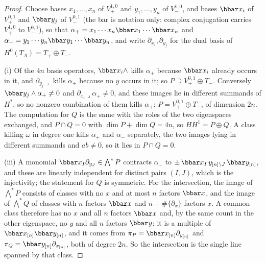 \begin{proof}
Choose bases $x_{1},\dots,x_{n}$ of $V_{+}^{1,0}$ and $y_{1},\dots,y_{n}$ of
$V_{-}^{1,0}$, and bases $\bbar x_{i}$ of $V_{+}^{0,1}$ and $\bbar y_{j}$ of
$V_{-}^{0,1}$ (the bar is notation only: complex conjugation carries
$V_{+}^{1,0}$ to $V_{-}^{0,1}$), so that $\alpha_{+}=x_{1}\cdots x_{n}\bbar x_{1}\cdots\bbar x_{n}$
and $\alpha_{-}=y_{1}\cdots y_{n}\bbar y_{1}\cdots\bbar y_{n}$, and write
$\partial_{x_{i}},\partial_{y_{j}}$ for the dual basis of
$H^{0}(T_{A})=T_{+}\oplus T_{-}$.

(i) Of the $4n$ basis operators, $\bbar x_{i}\wedge$ kills $\alpha_{+}$
because $\bbar x_{i}$ already occurs in it, and $\partial_{y_{j}}\lrcorner$
kills $\alpha_{+}$ because no $y$ occurs in it; so $P\supseteq
V_{+}^{0,1}\oplus T_{-}$. Conversely $\bbar y_{j}\wedge\alpha_{+}\ne0$ and
$\partial_{x_{i}}\lrcorner\alpha_{+}\ne0$, and these images lie in different
summands of $H^{*}$, so no nonzero combination of them kills $\alpha_{+}$:
$P=V_{+}^{0,1}\oplus T_{-}$, of dimension $2n$. The computation for $Q$ is the
same with the roles of the two eigenspaces exchanged, and
$P\cap Q=0$ with $\dim P+\dim Q=4n$, so $HH^{1}=P\oplus Q$. A class killing
$\omega$ in degree one kills $\alpha_{+}$ and $\alpha_{-}$ separately, the two
images lying in different summands and $ab\ne0$, so it lies in $P\cap Q=0$.

(iii) A monomial $\bbar x_{I}\partial_{y_{J}}\in\bigwedge^{*}P$ contracts
$\alpha_{-}$ to $\pm\,\bbar x_{I}\,y_{[n]\setminus J}\,\bbar y_{[n]}$, and
these are linearly independent for distinct pairs $(I,J)$, which is the
injectivity; the statement for $Q$ is symmetric. For the intersection, the
image of $\bigwedge^{*}P$ consists of classes with no $x$ and at most $n$
factors $\bbar x$, and the image of $\bigwedge^{*}Q$ of classes with $n$
factors $\bbar x$ and $n-\#\{\partial_{x}\}$ factors $x$. A common class
therefore has no $x$ and all $n$ factors $\bbar x$ and, by the same count in
the other eigenspace, no $y$ and all $n$ factors $\bbar y$: it is a multiple
of $\bbar x_{[n]}\bbar y_{[n]}$, and it comes from
$\pi_{P}=\bbar x_{[n]}\partial_{y_{[n]}}$ and
$\pi_{Q}=\bbar y_{[n]}\partial_{x_{[n]}}$, both of degree $2n$. So the
intersection is the single line spanned by that class.


\end{proof}
